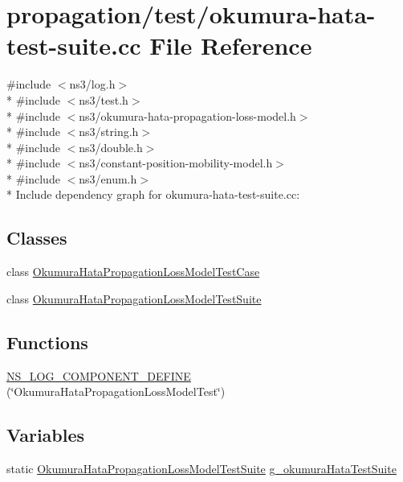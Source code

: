 \hypertarget{okumura-hata-test-suite_8cc}{}\section{propagation/test/okumura-\/hata-\/test-\/suite.cc File Reference}
\label{okumura-hata-test-suite_8cc}
{\ttfamily \#include $<$ns3/log.\+h$>$}\\*
{\ttfamily \#include $<$ns3/test.\+h$>$}\\*
{\ttfamily \#include $<$ns3/okumura-\/hata-\/propagation-\/loss-\/model.\+h$>$}\\*
{\ttfamily \#include $<$ns3/string.\+h$>$}\\*
{\ttfamily \#include $<$ns3/double.\+h$>$}\\*
{\ttfamily \#include $<$ns3/constant-\/position-\/mobility-\/model.\+h$>$}\\*
{\ttfamily \#include $<$ns3/enum.\+h$>$}\\*
Include dependency graph for okumura-\/hata-\/test-\/suite.cc\+:
\subsection*{Classes}
\begin{DoxyCompactItemize}
\item 
class \hyperlink{classOkumuraHataPropagationLossModelTestCase}{Okumura\+Hata\+Propagation\+Loss\+Model\+Test\+Case}
\item 
class \hyperlink{classOkumuraHataPropagationLossModelTestSuite}{Okumura\+Hata\+Propagation\+Loss\+Model\+Test\+Suite}
\end{DoxyCompactItemize}
\subsection*{Functions}
\begin{DoxyCompactItemize}
\item 
\hyperlink{okumura-hata-test-suite_8cc_abb7a645403569e4fdfa86215280d12a2}{N\+S\+\_\+\+L\+O\+G\+\_\+\+C\+O\+M\+P\+O\+N\+E\+N\+T\+\_\+\+D\+E\+F\+I\+NE} (\char`\"{}Okumura\+Hata\+Propagation\+Loss\+Model\+Test\char`\"{})
\end{DoxyCompactItemize}
\subsection*{Variables}
\begin{DoxyCompactItemize}
\item 
static \hyperlink{classOkumuraHataPropagationLossModelTestSuite}{Okumura\+Hata\+Propagation\+Loss\+Model\+Test\+Suite} \hyperlink{okumura-hata-test-suite_8cc_a80425991c5b904d5adaf6532cf5652a2}{g\+\_\+okumura\+Hata\+Test\+Suite}
\end{DoxyCompactItemize}


